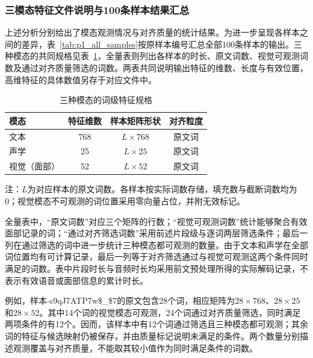 \subsubsection{三模态特征文件说明与100条样本结果汇总}
\label{sec:p1_delivery}

上述分析分别给出了模态观测情况与对齐质量的统计结果。为进一步呈现各样本之间的差异，表~\ref{tab:p1_all_samples}按原样本编号汇总全部100条样本的输出。三种模态的共同规格见表~\ref{tab:p1_feature_specification}，全量表则列出各样本的时长、原文词数、视觉可观测词数及通过对齐质量筛选的词数。两表共同说明输出特征的维数、长度与有效位置，高维特征的具体数值另存于对应文件中。

\begin{table}[H]
    \centering\small
    \caption{三种模态的词级特征规格}
    \label{tab:p1_feature_specification}
    \renewcommand{\arraystretch}{1.18}
    \begin{lrbox}{\pOneResultTableBox}
\begin{tabular}{@{}lccc@{}}
        \toprule
        模态 & 特征维数 & 样本矩阵形状 & 对齐粒度\\ \midrule
        文本 & 768 & $L\times768$ & 原文词\\
        声学 & 25 & $L\times25$ & 原文词\\
        视觉（面部） & 52 & $L\times52$ & 原文词\\ \bottomrule
    \end{tabular}
\end{lrbox}
\usebox{\pOneResultTableBox}
    \par\smallskip
    \parbox{\wd\pOneResultTableBox}{\footnotesize 注：$L$为对应样本的原文词数。各样本按实际词数存储，填充数与截断词数均为0；视觉模态不可观测的词位置采用零向量占位，并附无效标记。}
\end{table}

全量表中，“原文词数”对应三个矩阵的行数；“视觉可观测词数”统计能够聚合有效面部记录的词；“通过对齐筛选词数”采用前述片段级与逐词两层筛选条件；最后一列在通过筛选的词中进一步统计三种模态都可观测的数量。由于文本和声学在全部词位置均有可计算记录，最后一列等于对齐筛选通过与视觉可观测这两个条件同时满足的词数。表中片段时长与音频时长均采用前文预处理所得的实际解码记录，不表示有效语音或面部信息的累计时长。

例如，样本-s9qJ7ATP7w\$\_\$7的原文包含28个词，相应矩阵为$28\times768$、$28\times25$和$28\times52$。其中14个词的视觉模态可观测，24个词通过对齐质量筛选，同时满足两项条件的有12个。因而，该样本中有12个词通过筛选且三种模态都可观测；其余词的特征与候选映射仍被保存，并由质量标记说明未满足的条件。两个数量分别描述观测覆盖与对齐质量，不能取其较小值作为同时满足条件的词数。

